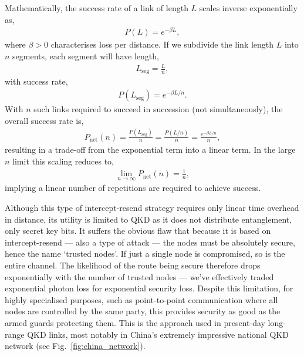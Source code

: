 Mathematically, the success rate of a link of length $L$ scales inverse exponentially as,
\begin{align}
	P(L) = e^{-\beta L},
\end{align}
where $\beta>0$ characterises loss per distance. If we subdivide the link length $L$ into $n$ segments, each segment will have length,
\begin{align}
	L_\mathrm{seg} = \frac{L}{n},
\end{align}
	with success rate,
\begin{align}
	P(L_\mathrm{seg}) = e^{-\beta L/n}.
\end{align}
With $n$ such links required to succeed in succession (not simultaneously), the overall success rate is,
\begin{align}
	P_\mathrm{net}(n) = \frac{P(L_\mathrm{seg})}{n} = \frac{P(L/n)}{n} = \frac{e^{-\beta L/n}}{n},
\end{align}
resulting in a trade-off from the exponential term into a linear term. In the large $n$ limit this scaling reduces to,
\begin{align}
	\lim_{n\to\infty} P_\mathrm{net}(n) = \frac{1}{n},
\end{align}
implying a linear number of repetitions are required to achieve success.

Although this type of intercept-resend strategy requires only linear time overhead in distance, its utility is limited to QKD as it does not distribute entanglement, only secret key bits. It suffers the obvious flaw that because it is based on intercept-resend --- also a type of attack --- the nodes must be absolutely secure, hence the name `trusted nodes'. If just a single node is compromised, so is the entire channel. The likelihood of the route being secure therefore drops exponentially with the number of trusted nodes --- we've effectively traded exponential photon loss for exponential security loss. Despite this limitation, for highly specialised purposes, such as point-to-point communication where all nodes are controlled by the same party, this provides security as good as the armed guards protecting them. This is the approach used in present-day long-range QKD links, most notably in China's extremely impressive national QKD network (see Fig.~\ref{fig:china_network}).

